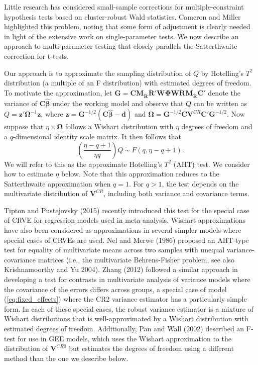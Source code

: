 \documentclass[12pt]{article}
\begin{document}
Little research has considered small-sample corrections for
multiple-constraint hypothesis tests based on cluster-robust Wald
statistics. Cameron and Miller highlighted this problem, noting that
some form of adjustment is clearly needed in light of the extensive work
on single-parameter tests. We now describe an approach to
multi-parameter testing that closely parallels the Satterthwaite
correction for t-tests.

Our approach is to approximate the sampling distribution of \(Q\) by
Hotelling's \(T^2\) distribution (a multiple of an F distribution) with
estimated degrees of freedom. To motivate the approximation, let
\(\mathbf{G} = \mathbf{C} \mathbf{M_{\ddot{R}}}\mathbf{\ddot{R}}'\mathbf{W}\boldsymbol\Phi\mathbf{W}\mathbf{\ddot{R}}\mathbf{M_{\ddot{R}}} \mathbf{C}'\)
denote the variance of \(\mathbf{C}\boldsymbol{\hat\beta}\) under the
working model and observe that \(Q\) can be written as
\(Q = \mathbf{z}' \boldsymbol\Omega^{-1} \mathbf{z}\), where
\(\mathbf{z} = \mathbf{G}^{-1/2}\left(\mathbf{C}\boldsymbol{\hat\beta} - \mathbf{d}\right)\)
and
\(\boldsymbol\Omega = \mathbf{G}^{-1/2} \mathbf{C} \mathbf{V}^{CR}\mathbf{C}'\mathbf{G}^{-1/2}\).
Now suppose that \(\eta \times \boldsymbol\Omega\) follows a Wishart
distribution with \(\eta\) degrees of freedom and a \(q\)-dimensional
identity scale matrix. It then follows that \begin{equation}
\label{eq:AHT}
\left(\frac{\eta - q + 1}{\eta q}\right) Q \ \dot\sim \ F(q, \eta - q + 1).
\end{equation} We will refer to this as the approximate Hotelling's
\(T^2\) (AHT) test. We consider how to estimate \(\eta\) below. Note
that this approximation reduces to the Satterthwaite approximation when
\(q = 1\). For \(q > 1\), the test depends on the multivariate
distribution of \(\mathbf{V}^{CR}\), including both variance and
covariance terms.

Tipton and Pustejovsky (2015) recently introduced this test for the
special case of CRVE for regression models used in meta-analysis.
Wishart approximations have also been considered as approximations in
several simpler models where special cases of CRVEs are used. Nel and
Merwe (1986) proposed an AHT-type test for equality of multivariate
means across two samples with unequal variance-covariance matrices
(i.e., the multivariate Behrens-Fisher problem, see also Krishnamoorthy
and Yu 2004). Zhang (2012) followed a similar approach in developing a
test for contrasts in multivariate analysis of variance models where the
covariance of the errors differs across groups, a special case of model
(\ref{eq:fixed_effects}) where the CR2 variance estimator has a
particularly simple form. In each of these special cases, the robust
variance estimator is a mixture of Wishart distributions that is
well-approximated by a Wishart distribution with estimated degrees of
freedom. Additionally, Pan and Wall (2002) described an F-test for use
in GEE models, which uses the Wishart approximation to the distribution
of \(\mathbf{V}^{CR0}\) but estimates the degrees of freedom using a
different method than the one we describe below.
\end{document}
